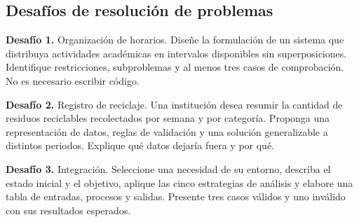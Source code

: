 \subsection{Desafíos de resolución de problemas}

\textbf{Desafío 1.} Organización de horarios. Diseñe la formulación de un sistema que distribuya actividades académicas en intervalos disponibles sin superposiciones. Identifique restricciones, subproblemas y al menos tres casos de comprobación. No es necesario escribir código.

\textbf{Desafío 2.} Registro de reciclaje. Una institución desea resumir la cantidad de residuos reciclables recolectados por semana y por categoría. Proponga una representación de datos, reglas de validación y una solución generalizable a distintos periodos. Explique qué datos dejaría fuera y por qué.

\textbf{Desafío 3.} Integración. Seleccione una necesidad de su entorno, describa el estado inicial y el objetivo, aplique las cinco estrategias de análisis y elabore una tabla de entradas, procesos y salidas. Presente tres casos válidos y uno inválido con sus resultados esperados.
